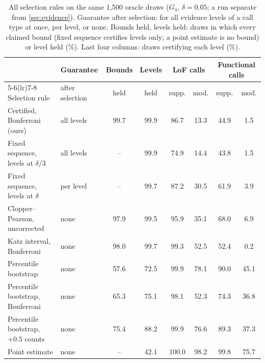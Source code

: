 \begin{table}[ht]
\centering
\caption{All selection rules on the same 1,500 oracle draws ($G_4$, $\delta=0.05$; a run separate from
\cref{sec:evidence}). Guarantee after selection: for all evidence levels of a call type at once, per level, or none.
Bounds held, levels held: draws in which every claimed bound (fixed sequence certifies levels only; a point estimate is no
bound) or level held (\%). Last four columns: draws certifying each level (\%).}\label{tab:app_baselines}
\setlength{\tabcolsep}{3.4pt}
\begin{tabular}{llcccccc}
\toprule
 & Guarantee & Bounds & Levels & \multicolumn{2}{c}{LoF calls} & \multicolumn{2}{c}{Functional calls}\\
\cmidrule(lr){5-6}\cmidrule(lr){7-8}
Selection rule & after selection & held & held & supp. & mod. & supp. & mod.\\
\midrule
Certified, Bonferroni (ours) & all levels & 99.7 & 99.9 & 86.7 & 13.3 & 44.9 & 1.5 \\
Fixed sequence, levels at $\delta/3$ & all levels & -- & 99.9 & 74.9 & 14.4 & 43.8 & 1.5 \\
Fixed sequence, levels at $\delta$ & per level & -- & 99.7 & 87.2 & 30.5 & 61.9 & 3.9 \\
Clopper--Pearson, uncorrected & none & 97.9 & 99.5 & 95.9 & 35.1 & 68.0 & 6.9 \\
Katz interval, Bonferroni & none & 98.0 & 99.7 & 99.3 & 52.5 & 52.4 & 0.2 \\
Percentile bootstrap & none & 57.6 & 72.5 & 99.9 & 78.1 & 90.0 & 45.1 \\
Percentile bootstrap, Bonferroni & none & 65.3 & 75.1 & 98.1 & 52.3 & 74.3 & 36.8 \\
Percentile bootstrap, $+0.5$ counts & none & 75.4 & 88.2 & 99.9 & 76.6 & 89.3 & 37.3 \\
Point estimate & none & -- & 42.1 & 100.0 & 98.2 & 99.8 & 75.7 \\
\bottomrule
\end{tabular}
\end{table}

